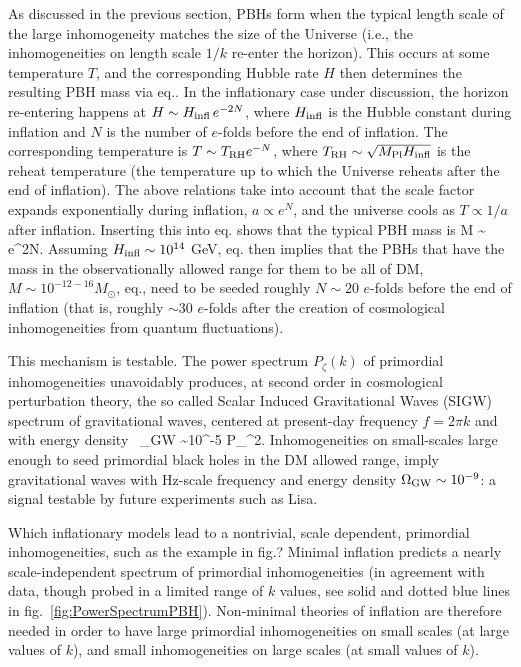 As discussed in the previous section, PBHs form when the typical length scale of the large
inhomogeneity matches the size of the Universe (i.e., the inhomogeneities on length scale $1/k$ re-enter the horizon). 
This occurs at some temperature $T$, and the corresponding Hubble rate $H$ then determines the resulting PBH mass via eq..
In the inflationary case under discussion, the horizon re-entering happens at
$H \sim H_{\rm infl} \, e^{-2N}$, where $H_{\rm infl}$ is the Hubble constant during inflation and $N$ is the number of $e$-folds before the end of inflation. The corresponding temperature is $T \sim T_{\rm RH} e^{-N}$, where $T_{\rm RH} \sim \sqrt{M_{\rm Pl} H_{\rm infl}}$ is the reheat temperature (the temperature up to which the Universe reheats after the end of inflation).
The above relations take into account that the scale factor expands exponentially during inflation, $a \propto e^{N}$,
and the universe cools as $T \propto 1/a$ after inflation.
Inserting this into eq. shows that the typical PBH mass is
\beq 
M \sim {} \, e^{2N}. 
\label{eq:MPBHN}
\eeq
Assuming $H_{\rm infl}\sim 10^{14}$ GeV, eq. then implies that the PBHs that have the mass in the observationally allowed range for them to be all of DM, 
$M \sim 10^{-12-16} M_\odot$, eq.,
need to be seeded roughly $N\sim 20$ $e$-folds  before the end of inflation 
(that is, roughly $\sim 30$ $e$-folds after the creation of cosmological inhomogeneities from quantum fluctuations).

\medskip

This mechanism is testable.
The power spectrum $P_\zeta(k)$ of primordial inhomogeneities
unavoidably produces,
at second order in cosmological perturbation theory,
the so called  Scalar Induced Gravitational Waves (SIGW) spectrum of gravitational waves, centered 
at present-day 
frequency $f=2\pi k$ and with energy density~\cite{SIGW}
\beq \Omega_{\rm GW} \equiv {}
\sim 10^{-5} P_\zeta^2.\eeq
Inhomogeneities on small-scales large enough 
to seed primordial black holes in the DM allowed range, 
imply gravitational waves with Hz-scale frequency
and energy density $\Omega_{\rm GW} \sim 10^{-9}$:
a signal testable by  future experiments such as {\sc Lisa}.

\medskip

Which inflationary models lead to a nontrivial, scale dependent, primordial inhomogeneities, such as the example in fig.?
Minimal inflation  predicts a nearly scale-independent spectrum of primordial inhomogeneities (in agreement with data, though probed in a limited range of $k$ values, see solid and dotted blue lines in fig.~\ref{fig:PowerSpectrumPBH}).
Non-minimal  theories of inflation are therefore needed in order to have large primordial inhomogeneities on small scales (at large values of $k$), and small inhomogeneities on large scales (at small values of $k$).

